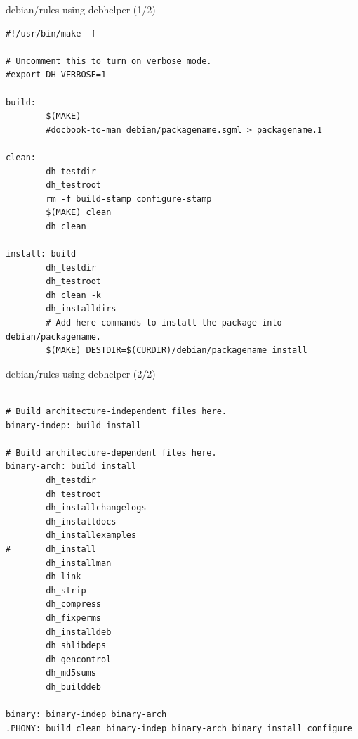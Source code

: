 \documentclass[10pt,final]{beamer}
\begin{document}
\begin{frame}[fragile]{debian/rules using debhelper (1/2)}
  \begin{lstlisting}[basicstyle=\ttfamily\footnotesize]
#!/usr/bin/make -f

# Uncomment this to turn on verbose mode.
#export DH_VERBOSE=1

build: 
        $(MAKE)
        #docbook-to-man debian/packagename.sgml > packagename.1

clean: 
        dh_testdir
        dh_testroot
        rm -f build-stamp configure-stamp
        $(MAKE) clean
        dh_clean 

install: build
        dh_testdir
        dh_testroot
        dh_clean -k 
        dh_installdirs
        # Add here commands to install the package into debian/packagename.
        $(MAKE) DESTDIR=$(CURDIR)/debian/packagename install
\end{lstlisting}
\end{frame}

\begin{frame}[fragile]{debian/rules using debhelper (2/2)}
  \begin{lstlisting}[basicstyle=\ttfamily\footnotesize]

# Build architecture-independent files here.
binary-indep: build install

# Build architecture-dependent files here.
binary-arch: build install
        dh_testdir
        dh_testroot
        dh_installchangelogs 
        dh_installdocs
        dh_installexamples
#       dh_install
        dh_installman
        dh_link
        dh_strip
        dh_compress
        dh_fixperms
        dh_installdeb
        dh_shlibdeps
        dh_gencontrol
        dh_md5sums
        dh_builddeb

binary: binary-indep binary-arch
.PHONY: build clean binary-indep binary-arch binary install configure
\end{lstlisting}
\end{frame}
\end{document}
